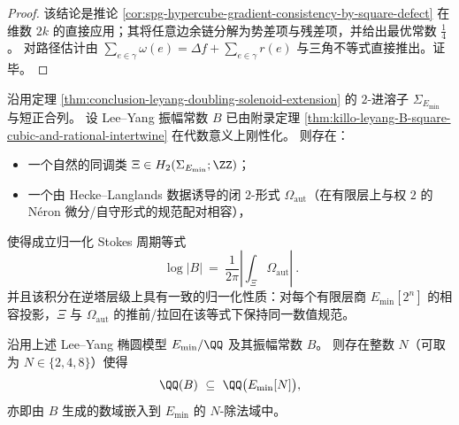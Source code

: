 \begin{proof}
该结论是推论 \ref{cor:spg-hypercube-gradient-consistency-by-square-defect} 在维数 \(2k\) 的直接应用；其将任意边余链分解为势差项与残差项，并给出最优常数 \(\frac14\)。
对路径估计由
\(
\sum_{e\in\gamma}\omega(e)=\Delta f+\sum_{e\in\gamma}r(e)
\)
与三角不等式直接推出。证毕。
\end{proof}

\begin{conjecture}\label{conj:conclusion-leyang-solenoid-stokes-regulator}
沿用定理 \ref{thm:conclusion-leyang-doubling-solenoid-extension} 的 \(2\)-进溶子 \(\Sigma_{E_{\min}}\) 与短正合列。
设 Lee--Yang 振幅常数 \(B\) 已由附录定理 \ref{thm:killo-leyang-B-square-cubic-and-rational-intertwine} 在代数意义上刚性化。
则存在：
\begin{itemize}
  \item 一个自然的同调类 \(\Xi\in H_2(\Sigma_{E_{\min}};\ZZ)\)；
  \item 一个由 Hecke--Langlands 数据诱导的闭 \(2\)-形式 \(\Omega_{\mathrm{aut}}\)（在有限层上与权 \(2\) 的 N\'eron 微分/自守形式的规范配对相容），
\end{itemize}
使得成立归一化 Stokes 周期等式
\[
\boxed{\ \log|B|\ =\ \frac{1}{2\pi}\left|\int_{\Xi}\Omega_{\mathrm{aut}}\right|\ }.
\]
并且该积分在逆塔层级上具有一致的归一化性质：对每个有限层商 \(E_{\min}[2^n]\) 的相容投影，\(\Xi\) 与 \(\Omega_{\mathrm{aut}}\) 的推前/拉回在该等式下保持同一数值规范。
\end{conjecture}

\begin{conjecture}\label{conj:conclusion-leyang-amplitude-division-field}
沿用上述 Lee--Yang 椭圆模型 \(E_{\min}/\QQ\) 及其振幅常数 \(B\)。
则存在整数 \(N\)（可取为 \(N\in\{2,4,8\}\)）使得
\[
\QQ(B)\ \subseteq\ \QQ\bigl(E_{\min}[N]\bigr),
\]
亦即由 \(B\) 生成的数域嵌入到 \(E_{\min}\) 的 \(N\)-除法域中。
\end{conjecture}


